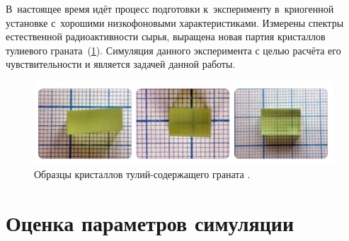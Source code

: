 \documentclass[a4paper,article,14pt]{extarticle}
\begin{document}
В~настоящее время идёт процесс подготовки к~эксперименту в~криогенной установке с~хорошими низкофоновыми характеристиками.
Измерены спектры естественной радиоактивности сырья, выращена новая партия кристаллов тулиевого граната~(\ref{fig:crystals}).
Симуляция данного эксперимента с целью расчёта его чувствительности и является задачей данной работы.
\begin{figure}[t]
    \centering
    \includegraphics[width=.9\textwidth]{images/Crystals.png}
    \caption{Образцы кристаллов тулий-содержащего граната {\TmAlO}.}\label{fig:crystals}
\end{figure}


\newpage
\section{Оценка параметров симуляции}
\end{document}
